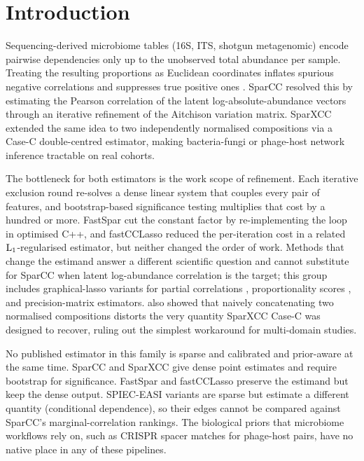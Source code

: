\documentclass[unnumsec,webpdf,contemporary,large]{oup-authoring-template}
\theoremstyle{thmstyleone}
\theoremstyle{thmstyletwo}
\theoremstyle{thmstylethree}
\begin{document}

\maketitle

\section{Introduction}\label{sec:intro}

Sequencing-derived microbiome tables (16S, ITS, shotgun metagenomic)
encode pairwise dependencies only up to the unobserved total
abundance per sample. Treating the resulting proportions as Euclidean
coordinates inflates spurious negative correlations and suppresses
true positive ones \citep{aitchison1986statistical,
lovell2015proportionality}. SparCC \citep{friedman2012sparcc} resolved
this by estimating the Pearson correlation of the latent
log-absolute-abundance vectors through an iterative refinement of the
Aitchison variation matrix. SparXCC \citep{jensen2024sparxcc} extended
the same idea to two independently normalised compositions via a
Case-C double-centred estimator, making bacteria-fungi or phage-host
network inference tractable on real cohorts.

The bottleneck for both estimators is the work scope of refinement.
Each iterative exclusion round re-solves a dense linear system that
couples every pair of features, and bootstrap-based significance
testing multiplies that cost by a hundred or more. FastSpar
\citep{watts2019fastspar} cut the constant factor by re-implementing
the loop in optimised C++, and fastCCLasso \citep{zhang2024fastcclasso}
reduced the per-iteration cost in a related ${\rm L}_1$-regularised
estimator, but neither changed the order of work. Methods that change
the estimand answer a different scientific question and cannot
substitute for SparCC when latent log-abundance correlation is the
target; this group includes graphical-lasso variants for partial
correlations \citep{kurtz2015spieceasi}, proportionality scores
\citep{lovell2015proportionality}, and precision-matrix estimators.
\citet{brunner2024crosskingdom} also showed that naively concatenating
two normalised compositions distorts the very quantity SparXCC Case-C
was designed to recover, ruling out the simplest workaround for
multi-domain studies.

No published estimator in this family is sparse and calibrated and
prior-aware at the same time. SparCC and SparXCC give dense point
estimates and require bootstrap for significance. FastSpar
\citep{watts2019fastspar} and fastCCLasso \citep{zhang2024fastcclasso}
preserve the estimand but keep the dense output. SPIEC-EASI variants
\citep{kurtz2015spieceasi} are sparse but estimate a different
quantity (conditional dependence), so their edges cannot be compared
against SparCC's marginal-correlation rankings. The biological priors
that microbiome workflows rely on, such as CRISPR spacer matches for
phage-host pairs, have no native place in any of these pipelines.
\end{document}
